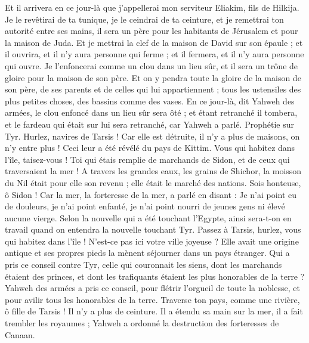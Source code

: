 \begin{multicols}{2}
Et il arrivera en ce jour-là que j'appellerai mon serviteur Eliakim, fils de Hilkija.
Je le revêtirai de ta tunique, je le ceindrai de ta ceinture, et je remettrai ton autorité entre ses mains, il sera un père pour les habitants de Jérusalem et pour la maison de Juda.
Et je mettrai la clef de la maison de David sur son épaule ; et il ouvrira, et il n'y aura personne qui ferme ; et il fermera, et il n'y aura personne qui ouvre.
Je l'enfoncerai comme un clou dans un lieu sûr, et il sera un trône de gloire pour la maison de son père.
Et on y pendra toute la gloire de la maison de son père, de ses parents et de celles qui lui appartiennent ; tous les ustensiles des plus petites choses, des bassins comme des vases. 
En ce jour-là, dit Yahweh des armées, le clou enfoncé dans un lieu sûr sera ôté ; et étant retranché il tombera, et le fardeau qui était sur lui sera retranché, car Yahweh a parlé.
\VerseOne{}Prophétie sur Tyr. Hurlez, navires de Tarsis ! Car elle est détruite, il n'y a plus de maisons, on n'y entre plus ! Ceci leur a été révélé du pays de Kittim.
Vous qui habitez dans l'île, taisez-vous ! Toi qui étais remplie de marchands de Sidon, et de ceux qui traversaient la mer !
A travers les grandes eaux, les grains de Shichor, la moisson du Nil était pour elle son revenu ; elle était le marché des nations.
Sois honteuse, ô Sidon ! Car la mer, la forteresse de la mer, a parlé en disant : Je n'ai point eu de douleurs, je n'ai point enfanté, je n'ai point nourri de jeunes gens ni élevé aucune vierge.
Selon la nouvelle qui a été touchant l'Egypte, ainsi sera-t-on en travail quand on entendra la nouvelle touchant Tyr.
Passez à Tarsis, hurlez, vous qui habitez dans l'île !
N'est-ce pas ici votre ville joyeuse ? Elle avait une origine antique et ses propres pieds la mènent séjourner dans un pays étranger.
Qui a pris ce conseil contre Tyr, celle qui couronnait les siens, dont les marchands étaient des princes, et dont les trafiquants étaient les plus honorables de la terre ?
Yahweh des armées a pris ce conseil, pour flétrir l'orgueil de toute la noblesse, et pour avilir tous les honorables de la terre.
Traverse ton pays, comme une rivière, ô fille de Tarsis ! Il n'y a plus de ceinture.
Il a étendu sa main sur la mer, il a fait trembler les royaumes ; Yahweh a ordonné la destruction des forteresses de Canaan.

\end{multicols}
